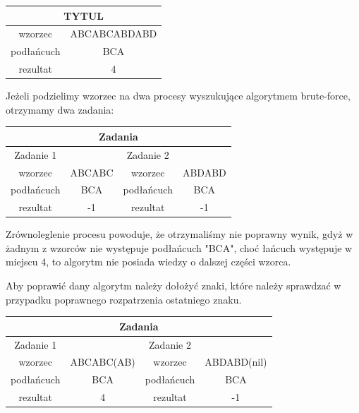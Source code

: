 \begin{center}
  \begin{tabular}{ |c|c|  } 
    \hline
    \multicolumn{2}{|c|}{TYTUL} \\
    \hline
    wzorzec & ABCABCABDABD \\
    \hline
    podłańcuch & BCA \\
    \hline
    rezultat & 4 \\
    \hline
  \end{tabular}
\end{center}

Jeżeli podzielimy wzorzec na dwa procesy wyszukujące algorytmem brute-force,
otrzymamy dwa zadania:

\begin{center}
  \begin{tabular}{ |c|c||c|c|  } 
    \hline
    \multicolumn{4}{|c|}{Zadania} \\
    \hline
    Zadanie 1 & & Zadanie 2 & \\
    \hline
    wzorzec & ABCABC & wzorzec & ABDABD \\
    \hline
    podłańcuch & BCA & podłańcuch & BCA \\
    \hline
    rezultat & -1 & rezultat & -1 \\ 
    \hline
  \end{tabular}
\end{center}

Zrównoleglenie procesu powoduje, że otrzymaliśmy nie poprawny wynik, gdyż w 
żadnym z wzorców nie występuje podłańcuch "BCA", choć łańcuch występuje w 
miejscu 4, to algorytm nie posiada wiedzy o dalszej części wzorca.

Aby poprawić dany algorytm należy dołożyć znaki, które należy sprawdzać w 
przypadku poprawnego rozpatrzenia ostatniego znaku.


\begin{center}
  \begin{tabular}{ |c|c||c|c|  } 
    \hline
    \multicolumn{4}{|c|}{Zadania} \\
    \hline
    Zadanie 1 & & Zadanie 2 & \\
    \hline
    wzorzec & ABCABC(AB) & wzorzec & ABDABD(nil) \\
    \hline
    podłańcuch & BCA & podłańcuch & BCA \\
    \hline
    rezultat & 4 & rezultat & -1 \\ 
    \hline
  \end{tabular}
\end{center}

